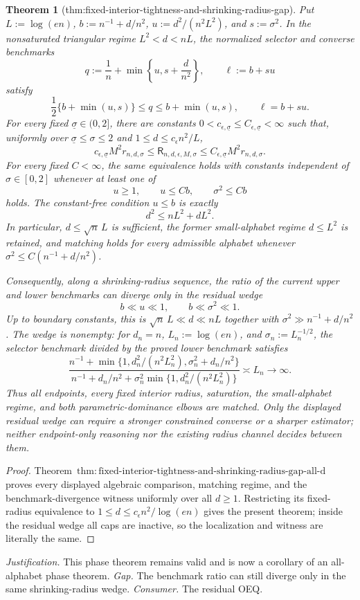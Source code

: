 \documentclass{article}
\newtheorem{theorem}{Theorem}
\begin{document}
\begin{theorem}[thm:fixed-interior-tightness-and-shrinking-radius-gap]\label{thm:fixed-interior-tightness-and-shrinking-radius-gap}
Put \(L:=\log(en)\), \(b:=n^{-1}+d/n^2\), \(u:=d^2/(n^2L^2)\), and \(s:=\sigma^2\).  In the nonsaturated triangular regime \(L^2<d<nL\), the normalized selector and converse benchmarks
\[
 q:=\frac1n+\min\left\{u,s+\frac d{n^2}\right\},
 \qquad
 \ell:=b+su
\]
satisfy
\[
 \frac12\{b+\min(u,s)\}\le q\le b+\min(u,s),
 \qquad \ell=b+su.
\]
For every fixed \(\underline\sigma\in(0,2]\), there are constants \(0<c_{\epsilon,\underline\sigma}\le C_{\epsilon,\underline\sigma}<\infty\) such that, uniformly over \(\underline\sigma\le\sigma\le2\) and \(1\le d\le c_{\epsilon}n^2/L\),
\[
 c_{\epsilon,\underline\sigma}M^2r_{n,d,\sigma}
 \le \mathsf R_{n,d,\epsilon,M,\sigma}
 \le C_{\epsilon,\underline\sigma}M^2r_{n,d,\sigma}.
\]
For every fixed \(C<\infty\), the same equivalence holds with constants independent of \(\sigma\in[0,2]\) whenever at least one of
\[
 u\ge1,
 \qquad u\le Cb,
 \qquad \sigma^2\le Cb
\]
holds.  The constant-free condition \(u\le b\) is exactly
\[
 d^2\le nL^2+dL^2.
\]
In particular, \(d\le\sqrt n\,L\) is sufficient, the former small-alphabet regime \(d\le L^2\) is retained, and matching holds for every admissible alphabet whenever \(\sigma^2\le C(n^{-1}+d/n^2)\).

Consequently, along a shrinking-radius sequence, the ratio of the current upper and lower benchmarks can diverge only in the residual wedge
\[
 b\ll u\ll1,
 \qquad
 b\ll\sigma^2\ll1.
\]
Up to boundary constants, this is \(\sqrt n\,L\ll d\ll nL\) together with \(\sigma^2\gg n^{-1}+d/n^2\).  The wedge is nonempty: for \(d_n=n\), \(L_n:=\log(en)\), and \(\sigma_n:=L_n^{-1/2}\), the selector benchmark divided by the proved lower benchmark satisfies
\[
 \frac{n^{-1}+\min\{1,d_n^2/(n^2L_n^2),\sigma_n^2+d_n/n^2\}}
 {n^{-1}+d_n/n^2+\sigma_n^2\min\{1,d_n^2/(n^2L_n^2)\}}
 \asymp L_n\longrightarrow\infty.
\]
Thus all endpoints, every fixed interior radius, saturation, the small-alphabet regime, and both parametric-dominance elbows are matched.  Only the displayed residual wedge can require a stronger constrained converse or a sharper estimator; neither endpoint-only reasoning nor the existing radius channel decides between them.
\end{theorem}
\begin{proof}
Theorem~\(\mathrm{thm:fixed\text{-}interior\text{-}tightness\text{-}and\text{-}shrinking\text{-}radius\text{-}gap\text{-}all\text{-}d}\) proves every displayed algebraic comparison, matching regime, and the benchmark-divergence witness uniformly over all \(d\ge1\).  Restricting its fixed-radius equivalence to \(1\le d\le c_{\epsilon}n^2/\log(en)\) gives the present theorem; inside the residual wedge all caps are inactive, so the localization and witness are literally the same.
\end{proof}
\par\smallskip\noindent \textit{Justification.} This phase theorem remains valid and is now a corollary of an all-alphabet phase theorem. \textit{Gap.} The benchmark ratio can still diverge only in the same shrinking-radius wedge. \textit{Consumer.} The residual OEQ.
\end{document}

